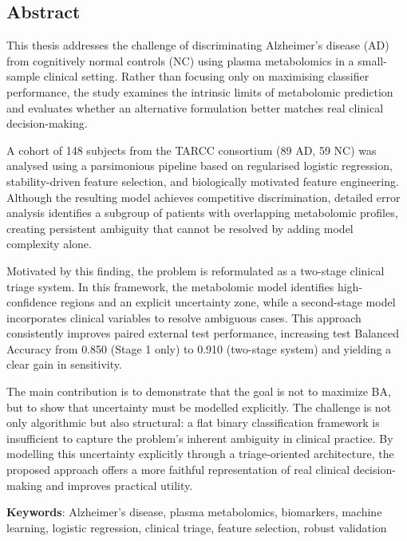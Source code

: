 %
\noindent \begin{center}
\section*{Abstract}
\par\end{center}

This thesis addresses the challenge of discriminating Alzheimer’s disease (AD) from cognitively normal controls (NC) using plasma metabolomics in a small-sample clinical setting. Rather than focusing only on maximising classifier performance, the study examines the intrinsic limits of metabolomic prediction and evaluates whether an alternative formulation better matches real clinical decision-making.

A cohort of 148 subjects from the TARCC consortium (89 AD, 59 NC) was analysed using a parsimonious pipeline based on regularised logistic regression, stability-driven feature selection, and biologically motivated feature engineering. Although the resulting model achieves competitive discrimination, detailed error analysis identifies a subgroup of patients with overlapping metabolomic profiles, creating persistent ambiguity that cannot be resolved by adding model complexity alone.

Motivated by this finding, the problem is reformulated as a two-stage clinical triage system. In this framework, the metabolomic model identifies high-confidence regions and an explicit uncertainty zone, while a second-stage model incorporates clinical variables to resolve ambiguous cases. This approach consistently improves paired external test performance, increasing test Balanced Accuracy from 0.850 (Stage 1 only) to 0.910 (two-stage system) and yielding a clear gain in sensitivity.

The main contribution is to demonstrate that the goal is not to maximize BA, but to show that uncertainty must be modelled explicitly. The challenge is not only algorithmic but also structural: a flat binary classification framework is insufficient to capture the problem's inherent ambiguity in clinical practice. By modelling this uncertainty explicitly through a triage-oriented architecture, the proposed approach offers a more faithful representation of real clinical decision-making and improves practical utility.

\vspace{0.5cm}
\begin{flushleft}
\textbf{Keywords}: Alzheimer's disease, plasma metabolomics, biomarkers, machine learning, logistic regression, clinical triage, feature selection, robust validation
\end{flushleft}
%